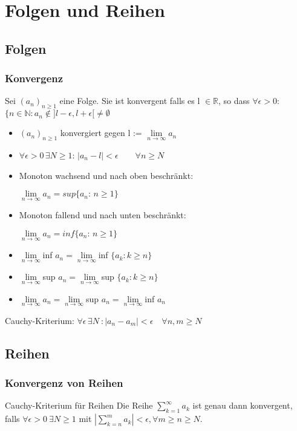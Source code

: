 \documentclass[a4paper,10pt]{article}
\def\limn{\lim\limits_{n\to \infty}}
\def\sumk{\sum\limits_{k=1}^{\infty}}
\def\R{\mathbb{R}}
\def\N{\mathbb{N}}
\begin{document}
\section{Folgen und Reihen}
\subsection{Folgen}
\subsubsection{Konvergenz}
Sei $(a_n)_{n\geq1}$ eine Folge. Sie ist konvergent falls es l $\in\R$, so dass $\forall \epsilon > 0$: $\{n\in\N:a_n\notin ]l-\epsilon,l+\epsilon[ \neq \emptyset $

\begin{itemize}
 \item $(a_n)_{n\geq 1}$ konvergiert gegen l := $\limn a_n$
 \item $\forall \epsilon >0 \, \exists N\geq 1$: $|a_n-l|<\epsilon \qquad \forall n\geq N$
 \item Monoton wachsend und nach oben beschränkt: \par $\limn a_n = sup\{a_n:\, n\geq 1\}$
 \item Monoton fallend und nach unten beschränkt: \par $\limn a_n = inf\{a_n:\, n\geq 1\}$
 \item $\limn$inf $a_n = \limn$inf $\{a_k : k\geq n\}$
 \item $\limn$sup $a_n = \limn$sup $\{a_k : k\geq n\}$
 \item $\limn a_n = \limn$sup $a_n =\limn$inf $a_n$
\end{itemize}

Cauchy-Kriterium: $\forall \epsilon \, \exists N \>: |a_n-a_m| < \epsilon \quad \forall n,m\geq N$

\subsection{Reihen}
\subsubsection{Konvergenz von Reihen}
\begin{mainbox}{Cauchy-Kriterium für Reihen}
Die Reihe $\sumk a_k$ ist genau dann konvergent, falls $\forall \epsilon > 0 \ \exists N \geq 1$ mit $| \sum\limits_{k=n}^{m} a_k | < \epsilon,  \forall m \geq n \ge N$.
\end{mainbox}
\end{document}
